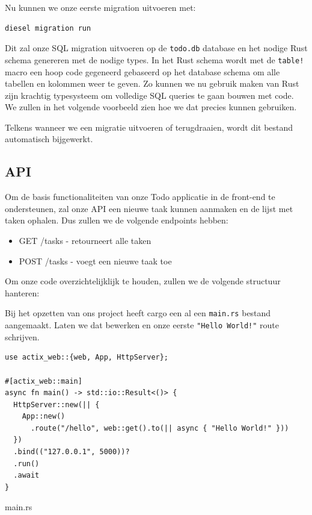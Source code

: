 Nu kunnen we onze eerste migration uitvoeren met:

\begin{verbatim}
diesel migration run
\end{verbatim}

Dit zal onze SQL migration uitvoeren op de \texttt{todo.db} database en het nodige Rust
schema genereren met de nodige types. In het Rust schema wordt met de \texttt{table!}
macro een hoop code gegeneerd gebaseerd op het database schema om alle tabellen en kolommen weer te
geven. Zo kunnen we nu gebruik maken van Rust zijn krachtig typesysteem om volledige SQL queries te
gaan bouwen met code. We zullen in het volgende voorbeeld zien hoe we dat precies kunnen gebruiken.

Telkens wanneer we een migratie uitvoeren of terugdraaien, wordt dit bestand automatisch bijgewerkt.

\clearpage

\subsection{API}

Om de basis functionaliteiten van onze Todo applicatie in de front-end te ondersteunen, zal onze API
een nieuwe taak kunnen aanmaken en de lijst met taken ophalen. Dus zullen we de volgende endpoints
hebben:
\begin{itemize}
  \item GET /tasks - retourneert alle taken
  \item POST /tasks - voegt een nieuwe taak toe
\end{itemize}


Om onze code overzichtelijklijk te houden, zullen we de volgende structuur hanteren:

Bij het opzetten van ons project heeft cargo een al een \texttt{main.rs} bestand
aangemaakt. Laten we dat bewerken en onze eerste \texttt{"Hello World!"} route schrijven.

\begin{listing}[h]
\begin{verbatim}
use actix_web::{web, App, HttpServer};

#[actix_web::main]
async fn main() -> std::io::Result<()> {
  HttpServer::new(|| {
    App::new()
      .route("/hello", web::get().to(|| async { "Hello World!" }))
  })
  .bind(("127.0.0.1", 5000))?
  .run()
  .await
}
\end{verbatim}
\caption{main.rs}
\end{listing}
\clearpage

